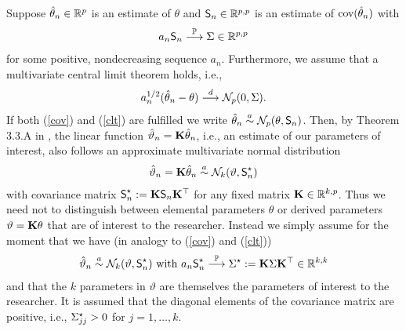 \documentclass[bimj,fleqn]{w-art}
\begin{document}
Suppose $\hat{\theta}_n \in \mathbb{R}^p$ is an estimate of $\theta$ and
$\textsf{S}_n \in \mathbb{R}^{p,p}$ is an estimate of $\text{cov}(\hat{\theta}_n)$ with
\begin{eqnarray} \label{cov}
a_n \textsf{S}_n \stackrel{\mathbb{P}}{\longrightarrow} \Sigma \in \mathbb{R}^{p,p}
\end{eqnarray}
for some positive, nondecreasing sequence $a_n$.
Furthermore, we assume that a multivariate central limit theorem holds,
i.e.,
\begin{eqnarray} \label{clt}
a_n^{1/2} (\hat{\theta}_n - \theta) \stackrel{d}{\longrightarrow} \mathcal{N}_p(0, \Sigma).
\end{eqnarray}
If both (\ref{cov}) and (\ref{clt}) are fulfilled we write $\hat{\theta}_n \stackrel{a}{\sim}
\mathcal{N}_p(\theta, \textsf{S}_n)$. Then, by Theorem 3.3.A in
\cite{Serfling1980}, the linear function $\hat{\vartheta}_n = \mathbf{K}
\hat{\theta}_n$, i.e., an estimate of our parameters of interest, 
also follows an approximate multivariate normal 
distribution
\begin{eqnarray*}
\hat{\vartheta}_n = \mathbf{K} \hat{\theta}_n \stackrel{a}{\sim} \mathcal{N}_k(\vartheta, \textsf{S}^\star_n)
\end{eqnarray*}
with covariance matrix $\textsf{S}^\star_n := \mathbf{K} \textsf{S}_n \mathbf{K}^\top$
for any fixed matrix $\mathbf{K} \in \mathbb{R}^{k,p}$. Thus we need not to distinguish
between elemental parameters $\theta$ or derived parameters $\vartheta = \mathbf{K} \theta$ 
that are of interest to the researcher. 
Instead we simply assume 
for the moment that we have (in analogy to (\ref{cov}) and (\ref{clt}))
\begin{eqnarray} \label{assume}
\hat{\vartheta}_n \stackrel{a}{\sim} \mathcal{N}_k(\vartheta, \textsf{S}^\star_n) \text{ with } 
a_n \textsf{S}^\star_n \stackrel{\mathbb{P}}{\longrightarrow} \Sigma^\star := \mathbf{K} \Sigma \mathbf{K}^\top \in \mathbb{R}^{k,k}
\end{eqnarray}
and that the $k$ parameters in $\vartheta$ are themselves the 
parameters of interest to the researcher. It is assumed that
the diagonal elements of the covariance matrix are positive, i.e., 
$\Sigma^\star_{jj} > 0$ for $j = 1, \dots, k$.
\end{document}
